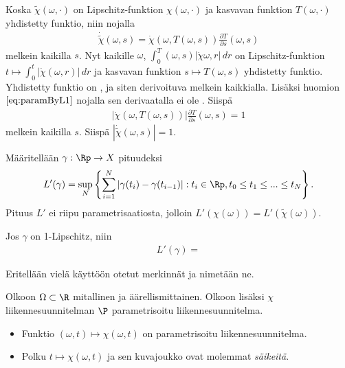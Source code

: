 Koska $\tilde \chi(\omega, \cdot)$ on Lipschitz-funktion $\chi(\omega, \cdot)$ ja kasvavan funktion $T(\omega, \cdot)$ yhdistetty funktio, niin  nojalla
    \begin{align*}
        \dot{\tilde {\chi}} (\omega, s)  = \dot \chi(\omega, T(\omega, s)) \frac{\partial T}{\partial s}(\omega, s)
    \end{align*}
    melkein kaikilla $s$. Nyt kaikille $\omega$, $\int_0^T(\omega,s) |\dot \chi \omega, r| \, dr$ on Lipschitz-funktion $t \mapsto \int_0^t|\dot \chi(\omega, r)| \, dr$ ja kasvavan funktion $s \mapsto T(\omega, s)$ yhdistetty funktio. Yhdistetty funktio on , ja siten derivoituva melkein kaikkialla. Lisäksi huomion $\eqref{eq:paramByL1}$ nojalla sen derivaatalla ei ole . Siispä
    \begin{align}\label{eq:paramByL2}
        |\dot \chi(\omega, T(\omega, s))| \frac{\partial T}{\partial s}(\omega, s) = 1
    \end{align}
    melkein kaikilla $s$. Siispä $|\dot{\tilde {\chi}} (\omega, s)| = 1$.
    

Määritellään $\gamma:\Rp \to X$ pituudeksi
    \begin{align*}
        L'(\gamma) = \sup_N\left\{\sum_{i=1}^N |\gamma(t_i) - \gamma(t_{i-1})| : t_i \in \Rp, t_0 \le t_1 \le ... \le t_N\right\}.
    \end{align*}
    Pituus $L'$ ei riipu parametrisaatiosta, jolloin $L'(\chi(\omega)) = L'(\tilde\chi(\omega))$.
    
    Jos $\gamma$ on 1-Lipschitz, niin 
    \begin{align*}
        L'(\gamma) = 
    \end{align*}
    
    
    
    

Eritellään vielä käyttöön otetut merkinnät ja nimetään ne.
\begin{definition}
    Olkoon $\Omega\subset \R$ mitallinen ja äärellismittainen. Olkoon lisäksi $\chi$ liikennesuunnitelman $\P$ parametrisoitu liikennesuunnitelma.
    \begin{itemize}
        \item Funktio $(\omega, t) \mapsto \chi(\omega, t)$ on parametrisoitu liikennesuunnitelma. 
        \item Polku $t \mapsto \chi(\omega, t)$ ja sen kuvajoukko ovat molemmat \textit{säikeitä}.
    \end{itemize}
\end{definition}
